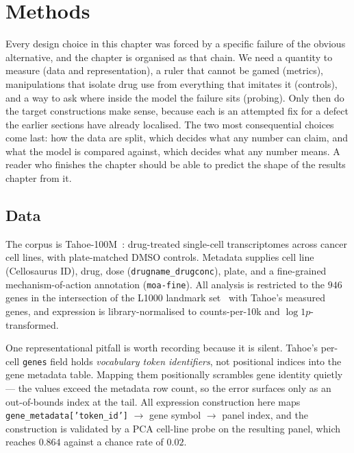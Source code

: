 \section{Methods}
\label{sec:methods}

Every design choice in this chapter was forced by a specific failure of the obvious alternative, and
the chapter is organised as that chain. We need a quantity to measure (data and representation),
a ruler that cannot be gamed (metrics), manipulations that isolate drug use from everything that
imitates it (controls), and a way to ask where inside the model the failure sits (probing). Only
then do the target constructions make sense, because each is an attempted fix for a defect the
earlier sections have already localised. The two most consequential choices come last: how the
data are split, which decides what any number can claim, and what the model is compared against,
which decides what any number means. A reader who finishes the chapter should be able to predict
the shape of the results chapter from it.

\subsection{Data}
\label{sec:methods-data}

The corpus is Tahoe-100M~\cite{tahoe100m}: drug-treated single-cell transcriptomes across cancer
cell lines, with plate-matched DMSO controls. Metadata supplies cell line (Cellosaurus ID), drug,
dose (\texttt{drugname\_drugconc}), plate, and a fine-grained mechanism-of-action annotation
(\texttt{moa-fine}). All analysis is restricted to the $946$ genes in the intersection of the L1000
landmark set~\cite{l1000} with Tahoe's measured genes, and expression is library-normalised to
counts-per-10k and $\log1p$-transformed.

One representational pitfall is worth recording because it is silent. Tahoe's per-cell
\texttt{genes} field holds \emph{vocabulary token identifiers}, not positional indices into the gene
metadata table. Mapping them positionally scrambles gene identity quietly --- the values exceed the
metadata row count, so the error surfaces only as an out-of-bounds index at the tail. All expression
construction here maps \texttt{gene\_metadata['token\_id']} $\rightarrow$ gene symbol $\rightarrow$
panel index, and the construction is validated by a PCA cell-line probe on the resulting panel,
which reaches $0.864$ against a chance rate of $0.02$.


